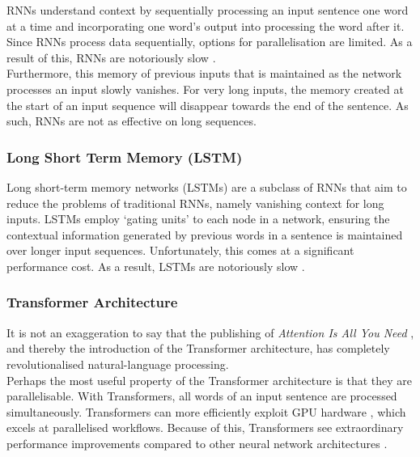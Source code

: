 \noindent
RNNs understand context by sequentially processing an input sentence one word at a time and incorporating one word's output into processing the word after it. Since RNNs process data sequentially, options for parallelisation are limited. As a result of this, RNNs are notoriously slow \cite{patiexploring}.\\

\noindent
Furthermore, this memory of previous inputs that is maintained as the network processes an input slowly vanishes. For very long inputs, the memory created at the start of an input sequence will disappear towards the end of the sentence. As such, RNNs are not as effective on long sequences. \\

\subsubsection{Long Short Term Memory (LSTM)}

\noindent
Long short-term memory networks (LSTMs) are a subclass of RNNs that aim to reduce the problems of traditional RNNs, namely vanishing context for long inputs. LSTMs employ `gating units' to each node in a network, ensuring the contextual information generated by previous words in a sentence is maintained over longer input sequences. Unfortunately, this comes at a significant performance cost. As a result, LSTMs are notoriously slow \cite{sundermeyer2012lstm}.

\subsubsection{Transformer Architecture}
\label{transformers}

\noindent
It is not an exaggeration to say that the publishing of \emph{Attention Is All You Need} \cite{attention}, and thereby the introduction of the Transformer architecture, has completely revolutionalised natural-language processing. \\

\noindent
Perhaps the most useful property of the Transformer architecture is that they are parallelisable. With Transformers, all words of an input sentence are processed simultaneously. Transformers can more efficiently exploit GPU hardware \cite{gpu-parallel}, which excels at parallelised workflows. Because of this, Transformers see extraordinary performance improvements compared to other neural network architectures \cite{attention}.\\

